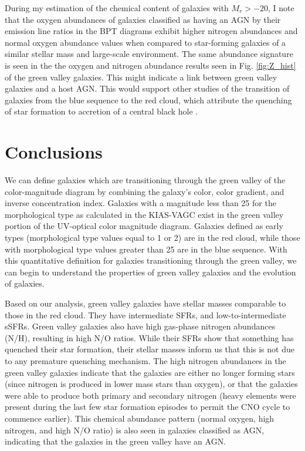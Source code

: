 During my estimation of the chemical content of galaxies with $M_r > -20$, I 
note that the oxygen abundances of galaxies classified as having an AGN by their 
emission line ratios in the BPT diagrams exhibit higher nitrogen abundances and 
normal oxygen abundance values when compared to star-forming galaxies of a 
similar stellar mass and large-scale environment.  The same abundance signature 
is seen in the the oxygen and nitrogen abundance results seen in Fig. 
\ref{fig:Z_hist} of the green valley galaxies.  This might indicate a 
link between green valley galaxies and a host AGN.  This would support other 
studies of the transition of galaxies from the blue sequence to the red cloud, 
which attribute the quenching of star formation to accretion of a central black 
hole \citep[e.g.,][]{Croton06,Stasinska08}.





\section[Conclusions]{Conclusions}

We can define galaxies which are transitioning through the green valley of the 
color-magnitude diagram by combining the galaxy's color, color gradient, and 
inverse concentration index.  Galaxies with a magnitude less than 25 for the 
morphological type as calculated in the KIAS-VAGC exist in the green valley 
portion of the UV-optical color magnitude diagram.  Galaxies defined as early 
types (morphological type values equal to 1 or 2) are in the red cloud, while 
those with morphological type values greater than 25 are in the blue sequence.  
With this quantitative definition for galaxies transitioning through the green 
valley, we can begin to understand the properties of green valley galaxies and 
the evolution of galaxies.

Based on our analysis, green valley galaxies have stellar masses comparable to 
those in the red cloud.  They have intermediate SFRs, and low-to-intermediate 
sSFRs.  Green valley galaxies also have high gas-phase nitrogen abundances (N/H), 
resulting in high N/O ratios.  While their SFRs show that something has quenched 
their star formation, their stellar masses inform us that this is not due to any 
premature quenching mechanism.  The high nitrogen abundances in the green valley 
galaxies indicate that the galaxies are either no longer forming stars (since 
nitrogen is produced in lower mass stars than oxygen), or that the galaxies were 
able to produce both primary and secondary nitrogen (heavy elements were present 
during the last few star formation episodes to permit the CNO cycle to commence 
earlier).  This chemical abundance pattern (normal oxygen, high nitrogen, and 
high N/O ratio) is also seen in galaxies classified as AGN, indicating that the 
galaxies in the green valley have an AGN.

